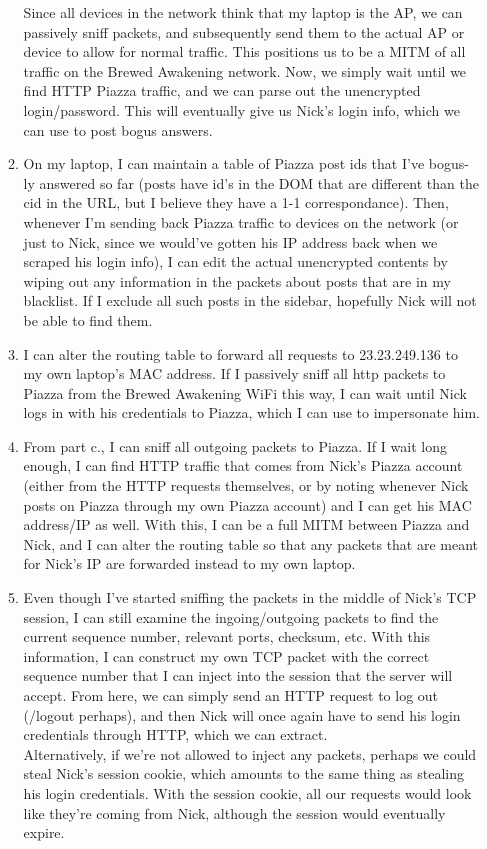 \begin{enumerate}
\begin{enumerate}
        Since all devices in the network think that my laptop is the AP, we can passively sniff packets, and subsequently send them to the actual AP or device to allow for normal traffic. This positions us to be a MITM of all traffic on the Brewed Awakening network. Now, we simply wait until we find HTTP Piazza traffic, and we can parse out the unencrypted login/password. This will eventually give us Nick's login info, which we can use to post bogus answers.

      \item On my laptop, I can maintain a table of Piazza post ids that I've bogus-ly answered so far (posts have id's in the DOM that are different than the cid in the URL, but I believe they have a 1-1 correspondance). Then, whenever I'm sending back Piazza traffic to devices on the network (or just to Nick, since we would've gotten his IP address back when we scraped his login info), I can edit the actual unencrypted contents by wiping out any information in the packets about posts that are in my blacklist. If I exclude all such posts in the sidebar, hopefully Nick will not be able to find them.
      \item I can alter the routing table to forward all requests to 23.23.249.136 to my own laptop's MAC address. If I passively sniff all http packets to Piazza from the Brewed Awakening WiFi this way, I can wait until Nick logs in with his credentials to Piazza, which I can use to impersonate him.




      \item From part c., I can sniff all outgoing packets to Piazza. If I wait long enough, I can find HTTP traffic that comes from Nick's Piazza account (either from the HTTP requests themselves, or by noting whenever Nick posts on Piazza through my own Piazza account) and I can get his MAC address/IP as well. With this, I can be a full MITM between Piazza and Nick, and I can alter the routing table so that any packets that are meant for Nick's IP are forwarded instead to my own laptop.

      \item Even though I've started sniffing the packets in the middle of Nick's TCP session, I can still examine the ingoing/outgoing packets to find the current sequence number, relevant ports, checksum, etc. With this information, I can construct my own TCP packet with the correct sequence number that I can inject into the session that the server will accept. From here, we can simply send an HTTP request to log out (/logout perhaps), and then Nick will once again have to send his login credentials through HTTP, which we can extract.\\

        Alternatively, if we're not allowed to inject any packets, perhaps we could steal Nick's session cookie, which amounts to the same thing as stealing his login credentials. With the session cookie, all our requests would look like they're coming from Nick, although the session would eventually expire.
    \end{enumerate}
\end{enumerate}

